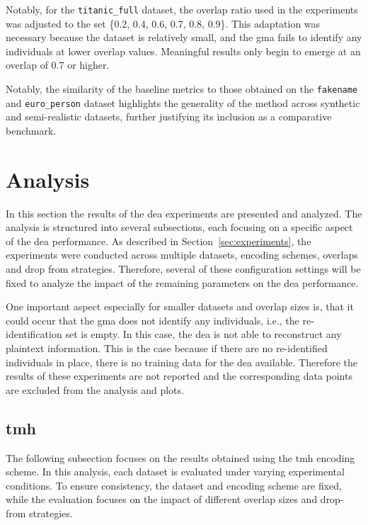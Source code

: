 Notably, for the \texttt{titanic\_full} dataset, the overlap ratio used in the experiments was adjusted to the set \{0.2, 0.4, 0.6, 0.7, 0.8, 0.9\}.
This adaptation was necessary because the dataset is relatively small, and the \ac{gma} fails to identify any individuals at lower overlap values.
Meaningful results only begin to emerge at an overlap of 0.7 or higher.

Notably, the similarity of the baseline metrics to those obtained on the \texttt{fakename} and \texttt{euro\_person} dataset highlights the generality of the method across synthetic and semi-realistic datasets, further justifying its inclusion as a comparative benchmark.

\section{Analysis}  \label{sec:analysis}

In this section the results of the \ac{dea} experiments are presented and analyzed.
The analysis is structured into several subsections, each focusing on a specific aspect of the \ac{dea} performance.
As described in Section~\ref{sec:experiments}, the experiments were conducted across multiple datasets, encoding schemes, overlaps and drop from strategies.
Therefore, several of these configuration settings will be fixed to analyze the impact of the remaining parameters on the \ac{dea} performance.

One important aspect especially for smaller datasets and overlap sizes is, that it could occur that the \ac{gma} does not identify any individuals, i.e., the re-identification set is empty.
In this case, the \ac{dea} is not able to reconstruct any plaintext information.
This is the case because if there are no re-identified individuals in place, there is no training data for the \ac{dea} available.
Therefore the results of these experiments are not reported and the corresponding data points are excluded from the analysis and plots.

\subsection{\ac{tmh}}

The following subsection focuses on the results obtained using the \ac{tmh} encoding scheme.
In this analysis, each dataset is evaluated under varying experimental conditions.
To ensure consistency, the dataset and encoding scheme are fixed, while the evaluation focuses on the impact of different overlap sizes and drop-from strategies.


